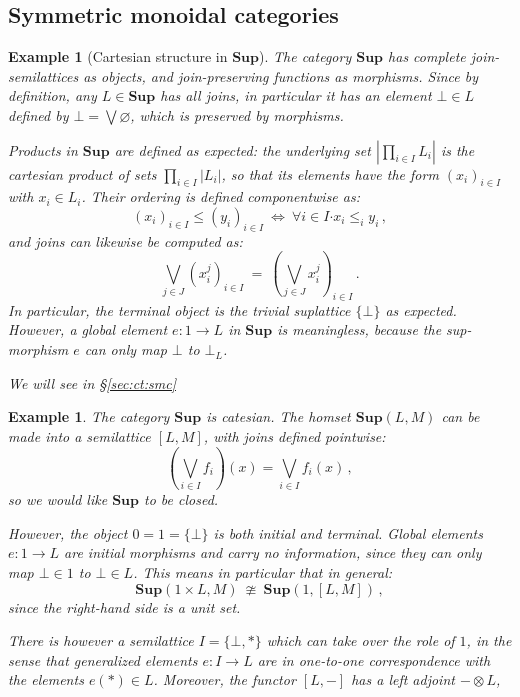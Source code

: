 \documentclass[draft,11pt]{report}
\newtheorem{example}[theorem]{Example}
\theoremstyle{definition}
\newcommand{\bdot}{\boldsymbol{\cdot}}
\begin{document}

\subsection{Symmetric monoidal categories} %

\begin{example}[Cartesian structure in $\mathbf{Sup}$]
The category $\mathbf{Sup}$
has complete join-semilattices as objects,
and join-preserving functions as morphisms.
Since by definition,
any $L \in \mathbf{Sup}$ has all joins,
in particular it has an element $\bot \in L$
defined by $\bot = \bigvee \varnothing$,
which is preserved by morphisms.

Products in $\mathbf{Sup}$ are defined as expected:
the underlying set $\left| \prod_{i \in I} L_i \right|$
is the cartesian product of sets $\prod_{i \in I} |L_i|$,
so that its elements have the form $(x_i)_{i \in I}$
with $x_i \in L_i$.
Their ordering is defined componentwise as:
\[
  (x_i)_{i \in I} \le (y_i)_{i \in I}
  \: \Leftrightarrow \:
  \forall i \in I \bdot x_i \le_i y_i
  \,,
\]
and joins can likewise be computed as:
\[
  \bigvee_{j \in J} (x_i^j)_{i \in I}
  \: = \:
  \left( \bigvee_{j \in J} x_i^j \right)_{i \in I}
  \,.
\]
In particular, the terminal object is the
trivial suplattice $\{ \bot \}$ as expected.
However,
a global element $e : 1 \rightarrow L$ in $\mathbf{Sup}$
is meaningless,
because the sup-morphism $e$
can only map $\bot$ to $\bot_L$.

We will see in \S\ref{sec:ct:smc}

\end{example}


\begin{example}
The category $\mathbf{Sup}$ is catesian.
The homset $\mathbf{Sup}(L, M)$
can be made into a semilattice $[L, M]$,
with joins defined pointwise:
\[
  \left( \bigvee_{i \in I} f_i \right)(x) =
  \bigvee_{i \in I} f_i(x)
  \,,
\]
so we would like $\mathbf{Sup}$ to be closed.

However, the object $0 = 1 = \{\bot\}$ is both initial and terminal.
Global elements $e : 1 \rightarrow L$
are initial morphisms and carry no information,
since they can only map $\bot \in 1$ to $\bot \in L$.
This means in particular that in general:
\[
  \mathbf{Sup}(1 \times L, M)
  \: \ncong \:
  \mathbf{Sup}(1, [L, M]) \,,
\]
since the right-hand side is a unit set.

There is however a semilattice $I = \{\bot, *\}$
which can take over the role of $1$,
in the sense that generalized elements $e : I \rightarrow L$
are in one-to-one correspondence with
the elements $e(*) \in L$.
Moreover, the functor $[L, {-}]$ has a left adjoint ${-} \otimes L$,
\end{example}
\end{document}

